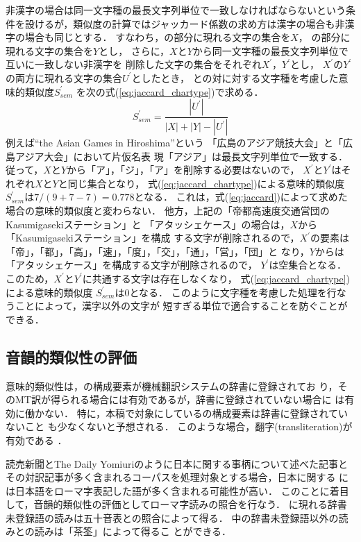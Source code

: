 非漢字の場合は同一文字種の最長文字列単位で一致しなければならないという条
件を設けるが，類似度の計算ではジャッカード係数の求め方は漢字の場合も非漢
字の場合も同じとする．
すなわち，{\MTNP}の{\N}部分に現れる文字の集合を$X$，
{\JNP}の{\N}部分に現れる文字の集合を$Y$とし，
さらに，$X$と$Y$から同一文字種の最長文字列単位で互いに一致しない非漢字を
削除した文字の集合をそれぞれ$X^\prime$，$Y^\prime$とし，
$X^\prime$の$Y^\prime$の両方に現れる文字の集合$U^\prime$としたとき，
{\MTNP}と{\JNP}の対に対する文字種を考慮した意味的類似度$S_{sem}^\prime$
を次の式(\ref{eq:jaccard_chartype})で求める．
\begin{equation}
S_{sem}^\prime = \frac{|U^\prime|}{|X| + |Y| - |U^\prime|}
\label{eq:jaccard_chartype}
\end{equation}
例えば``the Asian Games in Hiroshima''という
{\MTNP}「広島のアジア競技大会」と{\JNP}「広島アジア大会」において片仮名表
現「アジア」は最長文字列単位で一致する．
従って，$X$と$Y$から「ア」，「ジ」，「ア」を削除する必要はないので，
$X^\prime$と$Y^\prime$はそれぞれ$X$と$Y$と同じ集合となり，
式(\ref{eq:jaccard_chartype})による意味的類似度
$S_{sem}^\prime$は$7/(9+7-7) = 0.778$となる．
これは，式(\ref{eq:jaccard})によって求めた場合の意味的類似度と変わらない．
他方，上記の「帝都高速度交通営団のKasumigasekiステーション」と
「アタッシェケース」の場合は，$X$から「Kasumigasekiステーション」を構成
する文字が削除されるので，$X^\prime$の要素は
「帝」，「都」，「高」，「速」，「度」，「交」，「通」，「営」，「団」と
なり，$Y$からは「アタッシェケース」を構成する文字が削除されるので，
$Y^\prime$は空集合となる．
このため，$X^\prime$と$Y^\prime$に共通する文字は存在しなくなり，
式(\ref{eq:jaccard_chartype})による意味的類似度
$S_{sem}^\prime$は$0$となる．
このように文字種を考慮した処理を行なうことによって，漢字以外の文字が
短すぎる単位で適合することを防ぐことができる．


\subsection{音韻的類似性の評価}
\label{sec:alignment:align:pho}

意味的類似性は，{\CPNP}の構成要素が機械翻訳システムの辞書に登録されてお
り，そのMT訳が得られる場合には有効であるが，辞書に登録されていない場合に
は有効に働かない．
特に，本稿で対象にしている{\CPNP}の構成要素は辞書に登録されていないこと
も少なくないと予想される．
このような場合，翻字(transliteration)が有効である
\cite{Al-Onaizan02,Virga03,Yoshimi04}．

読売新聞とThe Daily Yomiuriのように日本に関する事柄について述べた記事と
その対訳記事が多く含まれるコーパスを処理対象とする場合，日本に関する
{\CPNP}には日本語をローマ字表記した語が多く含まれる可能性が高い．
このことに着目して，音韻的類似性の評価としてローマ字読みの照合を行なう．
{\MTNP}に現れる辞書未登録語の読みは五十音表との照合によって得る．
{\MTNP}中の辞書未登録語以外の読みと{\JNP}の読みは「茶筌」によって得るこ
とができる． 

